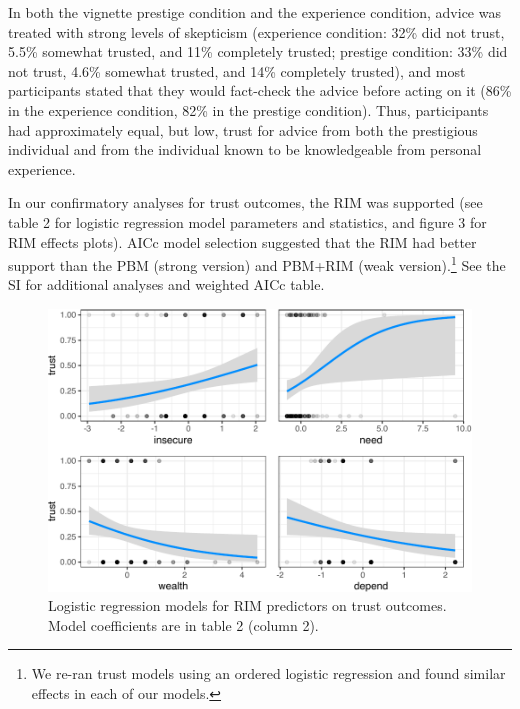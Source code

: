 \documentclass[
  11pt,
]{article}
\begin{document}
In both the vignette prestige condition and the experience condition,
advice was treated with strong levels of skepticism (experience
condition: 32\% did not trust, 5.5\% somewhat trusted, and 11\%
completely trusted; prestige condition: 33\% did not trust, 4.6\%
somewhat trusted, and 14\% completely trusted), and most participants
stated that they would fact-check the advice before acting on it (86\%
in the experience condition, 82\% in the prestige condition). Thus,
participants had approximately equal, but low, trust for advice from
both the prestigious individual and from the individual known to be
knowledgeable from personal experience.

In our confirmatory analyses for trust outcomes, the RIM was supported
(see table 2 for logistic regression model parameters and statistics,
and figure 3 for RIM effects plots). AICc model selection suggested that
the RIM had better support than the PBM (strong version) and PBM+RIM
(weak
version).\footnote{We re-ran trust models using an ordered logistic regression and found similar effects in each of our models.}
See the SI for additional analyses and weighted AICc table.

\begin{figure}
\centering
\includegraphics{trust-advice-writeup_files/figure-latex/confirm_effplot-1.pdf}
\caption{Logistic regression models for RIM predictors on trust
outcomes. Model coefficients are in table 2 (column 2).}
\end{figure}
\end{document}
